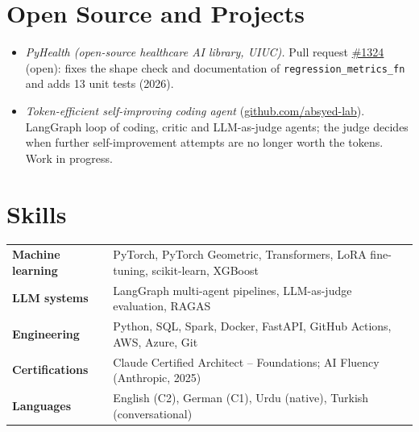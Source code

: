 \documentclass[11pt,letterpaper]{article}
\begin{document}
\section{Open Source and Projects}
\begin{itemize}
  \item \textit{PyHealth (open-source healthcare AI library, UIUC).} Pull request \href{https://github.com/sunlabuiuc/PyHealth/pull/1324}{\#1324} (open):
        fixes the shape check and documentation of \texttt{regression\_metrics\_fn} and adds 13 unit tests (2026).
  \item \textit{Token-efficient self-improving coding agent} (\href{https://github.com/absyed-lab/token-efficient-self-improving-agent}{github.com/absyed-lab}).
        LangGraph loop of coding, critic and LLM-as-judge agents; the judge decides when further self-improvement
        attempts are no longer worth the tokens. Work in progress.
\end{itemize}

\section{Skills}
\begin{tabularx}{\linewidth}{@{}p{3.3cm}X@{}}
  \textbf{Machine learning} & PyTorch, PyTorch Geometric, Transformers, LoRA fine-tuning, scikit-learn, XGBoost \\
  \textbf{LLM systems} & LangGraph multi-agent pipelines, LLM-as-judge evaluation, RAGAS \\
  \textbf{Engineering} & Python, SQL, Spark, Docker, FastAPI, GitHub Actions, AWS, Azure, Git \\
  \textbf{Certifications} & Claude Certified Architect -- Foundations; AI Fluency (Anthropic, 2025) \\
  \textbf{Languages} & English (C2), German (C1), Urdu (native), Turkish (conversational) \\
\end{tabularx}
\end{document}
